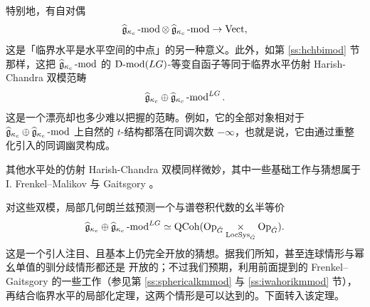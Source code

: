 特别地，有自对偶
%
\[
    \fgc\mod \otimes \hspace{.7mm} \fgc\mod \rightarrow \Vect,
\]
%
这是「临界水平是水平空间的中点」的另一种意义。此外，如第 \ref{ss:hchbimod} 节那样，这把
$\fgc\mod$ 的 $\Dmod(LG)$-等变自函子等同于临界水平仿射 Harish-Chandra 双模范畴
%
\[
      \fgc \oplus \fgc \mod^{LG}.
\]
%
这是一个漂亮却也多少难以把握的范畴。例如，它的全部对象相对于 $\fgc \oplus \fgc\mod$ 上自然的
$t$-结构都落在同调次数 $-\infty$，也就是说，它由通过重整化引入的同调幽灵构成。

\begin{re} 其他水平处的仿射 Harish-Chandra 双模同样微妙，其中一些基础工作与猜想属于 I. Frenkel--Malikov
\cite{frenkelmalikov1} 与 Gaitsgory \cite{quantum-langlands-summary}。
\end{re}

对这些双模，局部几何朗兰兹预测一个与谱卷积代数的幺半等价
%
\[
      \fgc \oplus \fgc \mod^{LG} \simeq \QCoh( \Op \underset \LS \times \Op).
\]
%
这是一个引人注目、且基本上仍完全开放的猜想。据我们所知，甚至连球情形与幂幺单值的驯分歧情形都还是
开放的；不过我们预期，利用前面提到的 Frenkel--Gaitsgory 的一些工作（参见第 \ref{ss:sphericalkmmod}
与 \ref{ss:iwahorikmmod} 节），再结合临界水平的局部化定理，这两个情形是可以达到的。下面转入该定理。
